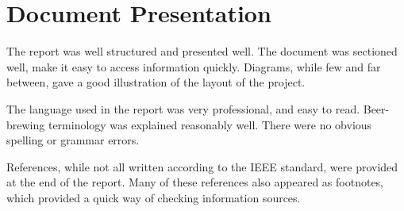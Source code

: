 \documentclass[a4paper,12pt]{article}
\begin{document}
\section{Document Presentation}
The report was well structured and presented well. The document was sectioned well, make it easy to access information quickly. Diagrams, while few and far between, gave a good illustration of the layout of the project.

The language used in the report was very professional, and easy to read. Beer-brewing terminology was explained reasonably well. There were no obvious spelling or grammar errors. 

References, while not all written according to the IEEE standard, were provided at the end of the report. Many of these references also appeared as footnotes, which provided a quick way of checking information sources.
\end{document}
